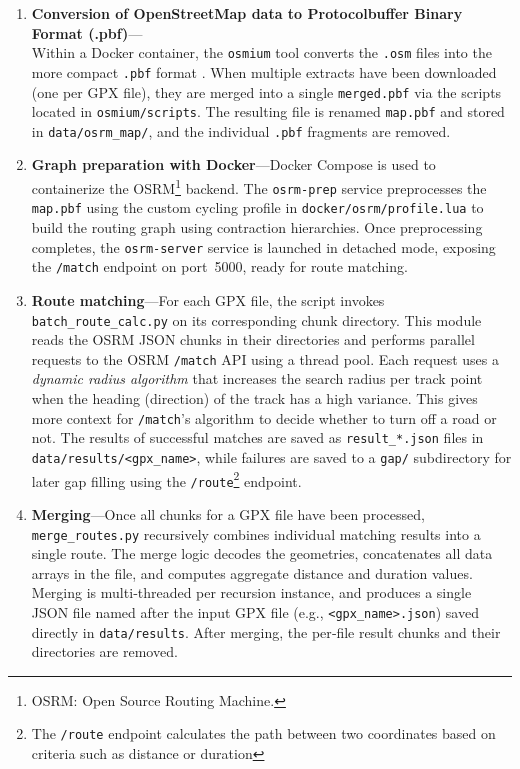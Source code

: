 \documentclass[11pt,a4paper]{article}
\begin{document}
\begin{enumerate}
\begin{itemize}
	      \end{itemize}
	\item \textbf{Conversion of OpenStreetMap data to Protocolbuffer Binary Format (.pbf)}---\\Within a Docker container, the \texttt{osmium} tool converts the \texttt{.osm} files into the more compact \texttt{.pbf} format \citep{osmium}. When multiple extracts have been downloaded (one per GPX file), they are merged into a single \texttt{merged.pbf} via the scripts located in \texttt{osmium/scripts}. The resulting file is renamed \texttt{map.pbf} and stored in \texttt{data/osrm\_map/}, and the individual \texttt{.pbf} fragments are removed.
	\item \textbf{Graph preparation with Docker}---Docker Compose is used to containerize the OSRM\footnote{OSRM: Open Source Routing Machine.} backend. The \texttt{osrm-prep} service preprocesses the \texttt{map.pbf} using the custom cycling profile in \texttt{docker/osrm/profile.lua} to build the routing graph using contraction hierarchies\citep{osrm}. Once preprocessing completes, the \texttt{osrm-server} service is launched in detached mode, exposing the \texttt{/match} endpoint on port~5000, ready for route matching.
	\item \textbf{Route matching}---For each GPX file, the script invokes \texttt{batch\_route\_calc.py} on its corresponding chunk directory.  This module reads the OSRM JSON chunks in their directories and performs parallel requests to the OSRM \texttt{/match} API using a thread pool.  Each request uses a \emph{dynamic radius algorithm} that increases the search radius per track point when the heading (direction) of the track has a high variance. This gives more context for \texttt{/match}'s algorithm to decide whether to turn off a road or not\citep{Newson2009}. The results of successful matches are saved as \texttt{result\_*.json} files in \texttt{data/results/\textless gpx\_name\textgreater{}}, while failures are saved to a \texttt{gap/} subdirectory for later gap filling using the \texttt{/route}\footnote{The \texttt{/route} endpoint calculates the path between two coordinates based on criteria such as distance or duration} endpoint.
	\item \textbf{Merging}---Once all chunks for a GPX file have been processed, \texttt{merge\_routes.py} recursively combines individual matching results into a single route.  The merge logic decodes the geometries, concatenates all data arrays in the file, and computes aggregate distance and duration values.  Merging is multi‑threaded per recursion instance, and produces a single JSON file named after the input GPX file (e.g., \texttt{\textless gpx\_name\textgreater{}.json}) saved directly in \texttt{data/results}.  After merging, the per‑file result chunks and their directories are removed.

\end{enumerate}
\end{document}
